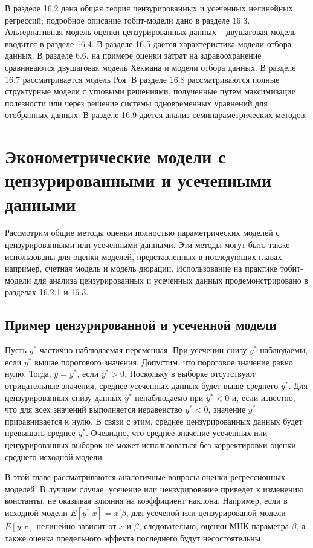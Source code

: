 В разделе 16.2 дана общая теория цензурированных и усеченных нелинейных регрессий; подробное описание тобит-модели дано в разделе 16.3. Альтернативная модель оценки цензурированных данных -- двушаговая модель -- вводится в разделе 16.4. В разделе 16.5 дается характеристика модели отбора данных. В разделе 6.6. на примере оценки затрат на здравоохранение сравниваются двушаговая модель Хекмана и модели отбора данных. В разделе 16.7 рассматривается модель Роя. В разделе 16.8 рассматриваются полные структурные модели с угловыми решениями, полученные путем максимизации полезности или через решение системы одновременных уравнений для отобранных данных. В разделе 16.9 дается анализ семипараметрических методов.


\section{Эконометрические модели с цензурированными и усеченными данными}

Рассмотрим общие методы оценки полностью параметрических моделей с цензурированными или усеченными данными. Эти методы могут быть также использованы для оценки моделей, представленных в последующих главах, например, счетная модель и модель дюрации. Использование на практике тобит-модели для анализа цензурированных и усеченных данных продемонстрировано в разделах 16.2.1 и 16.3.

\subsection{Пример цензурированной и усеченной модели}

Пусть $y^{*}$ частично наблюдаемая переменная. При усечении снизу $y^{*}$ наблюдаемы, если $y^{*}$ вышае порогового значения. Допустим, что пороговое значение равно нулю. Тогда, $y=y^{*}$, если $y^{*}>0$. Поскольку в выборке отсутствуют отрицательные значения, среднее усеченных данных будет выше среднего $y^{*}$. Для цензурированных снизу данных $y^{*}$ ненаблюдаемо при $y^{*}<0$ и, если известно, что для всех значений выполняется неравенство $y^{*}<0$, значение $y^{*}$ приравнивается к нулю. В связи с этим, среднее цензурированных данных будет превышать среднее $y^{*}$. Очевидно, что среднее значение усеченных или цензурированных выборок не может использоваться без корректировки оценки среднего исходной модели.

В этой главе рассматриваются аналогичные вопросы оценки регрессионных моделей. В лучшем случае, усечение или цензурирование приведет к изменению константы, не оказывая влияния на коэффициент наклона. Например, если в исходной модели $E[y^{*}|x]=x'\beta$, для усеченой или цензурированой модели $E[y|x]$ нелинейно зависит от $x$ и $\beta$, следовательно, оценки МНК параметра $\beta$, а также оценка предельного эффекта последнего будут несостоятельны.

